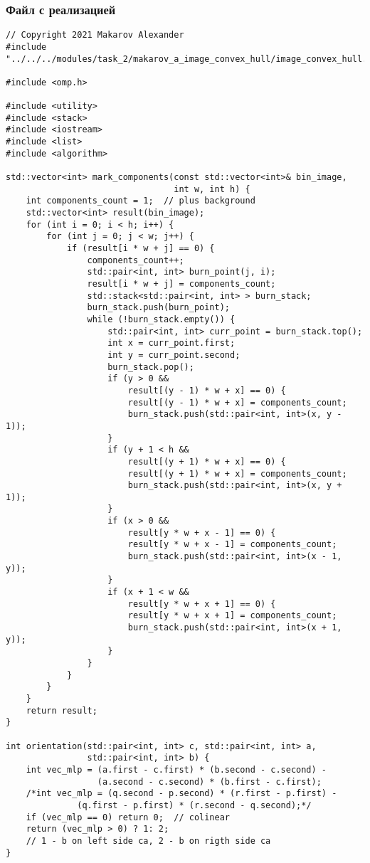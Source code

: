 \documentclass{report}
\begin{document}
\subsubsection{Файл с реализацией}
\begin{lstlisting}
// Copyright 2021 Makarov Alexander
#include "../../../modules/task_2/makarov_a_image_convex_hull/image_convex_hull.h"

#include <omp.h>

#include <utility>
#include <stack>
#include <iostream>
#include <list>
#include <algorithm>

std::vector<int> mark_components(const std::vector<int>& bin_image,
                                 int w, int h) {
    int components_count = 1;  // plus background
    std::vector<int> result(bin_image);
    for (int i = 0; i < h; i++) {
        for (int j = 0; j < w; j++) {
            if (result[i * w + j] == 0) {
                components_count++;
                std::pair<int, int> burn_point(j, i);
                result[i * w + j] = components_count;
                std::stack<std::pair<int, int> > burn_stack;
                burn_stack.push(burn_point);
                while (!burn_stack.empty()) {
                    std::pair<int, int> curr_point = burn_stack.top();
                    int x = curr_point.first;
                    int y = curr_point.second;
                    burn_stack.pop();
                    if (y > 0 &&
                        result[(y - 1) * w + x] == 0) {
                        result[(y - 1) * w + x] = components_count;
                        burn_stack.push(std::pair<int, int>(x, y - 1));
                    }
                    if (y + 1 < h &&
                        result[(y + 1) * w + x] == 0) {
                        result[(y + 1) * w + x] = components_count;
                        burn_stack.push(std::pair<int, int>(x, y + 1));
                    }
                    if (x > 0 &&
                        result[y * w + x - 1] == 0) {
                        result[y * w + x - 1] = components_count;
                        burn_stack.push(std::pair<int, int>(x - 1, y));
                    }
                    if (x + 1 < w &&
                        result[y * w + x + 1] == 0) {
                        result[y * w + x + 1] = components_count;
                        burn_stack.push(std::pair<int, int>(x + 1, y));
                    }
                }
            }
        }
    }
    return result;
}

int orientation(std::pair<int, int> c, std::pair<int, int> a,
                std::pair<int, int> b) {
    int vec_mlp = (a.first - c.first) * (b.second - c.second) -
                  (a.second - c.second) * (b.first - c.first);
    /*int vec_mlp = (q.second - p.second) * (r.first - p.first) -
              (q.first - p.first) * (r.second - q.second);*/
    if (vec_mlp == 0) return 0;  // colinear
    return (vec_mlp > 0) ? 1: 2;
    // 1 - b on left side ca, 2 - b on rigth side ca
}


\end{lstlisting}
\end{document}
